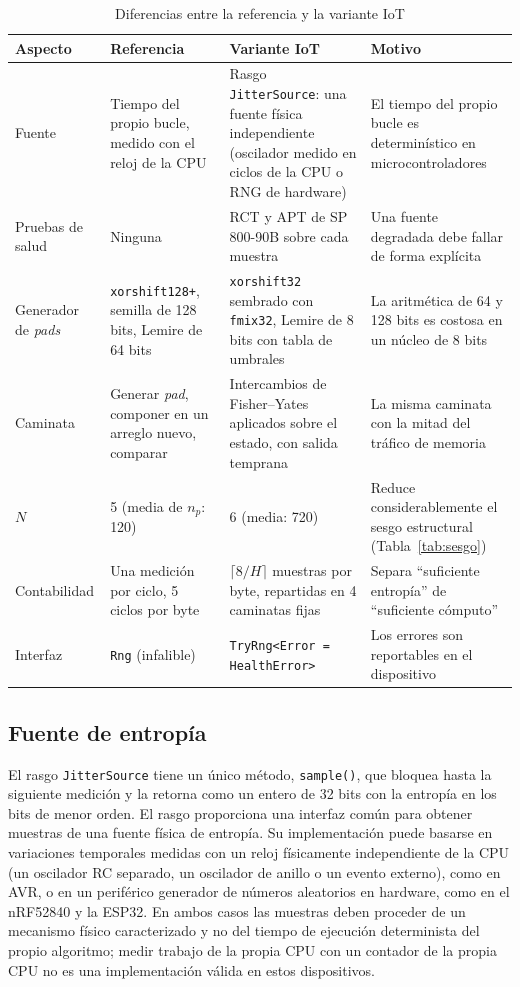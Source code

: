 \begin{table}[H]
\centering
\caption{Diferencias entre la referencia y la variante IoT}
\label{tab:cambios_iot}
\begin{tabularx}{\textwidth}{@{}L{0.17\textwidth}L{0.25\textwidth}L{0.27\textwidth}Y@{}}
\toprule
\textbf{Aspecto} & \textbf{Referencia} & \textbf{Variante IoT} & \textbf{Motivo} \\
\midrule
Fuente & Tiempo del propio bucle, medido con el reloj de la CPU & Rasgo \texttt{JitterSource}: una fuente física independiente (oscilador medido en ciclos de la CPU o RNG de hardware) & El tiempo del propio bucle es determinístico en microcontroladores \\
Pruebas de salud & Ninguna & RCT y APT de SP 800-90B sobre cada muestra & Una fuente degradada debe fallar de forma explícita \\
Generador de \textit{pads} & \texttt{xorshift128+}, semilla de 128 bits, Lemire de 64 bits & \texttt{xorshift32} sembrado con \texttt{fmix32}, Lemire de 8 bits con tabla de umbrales & La aritmética de 64 y 128 bits es costosa en un núcleo de 8 bits \\
Caminata & Generar \textit{pad}, componer en un arreglo nuevo, comparar & Intercambios de Fisher--Yates aplicados sobre el estado, con salida temprana & La misma caminata con la mitad del tráfico de memoria \\
$N$ & 5 (media de $n_p$: 120) & 6 (media: 720) & Reduce considerablemente el sesgo estructural (Tabla~\ref{tab:sesgo}) \\
Contabilidad & Una medición por ciclo, 5 ciclos por byte & $\lceil 8/H \rceil$ muestras por byte, repartidas en 4 caminatas fijas & Separa ``suficiente entropía'' de ``suficiente cómputo'' \\
Interfaz & \texttt{Rng} (infalible) & \texttt{TryRng<Error = HealthError>} & Los errores son reportables en el dispositivo \\
\bottomrule
\end{tabularx}
\end{table}

\subsection{Fuente de entropía}

El rasgo \texttt{JitterSource} tiene un único método, \texttt{sample()}, que bloquea hasta la siguiente medición y la retorna como un entero de 32 bits con la entropía en los bits de menor orden. El rasgo proporciona una interfaz común para obtener muestras de una fuente física de entropía. Su implementación puede basarse en variaciones temporales medidas con un reloj físicamente independiente de la CPU (un oscilador RC separado, un oscilador de anillo o un evento externo), como en AVR, o en un periférico generador de números aleatorios en hardware, como en el nRF52840 y la ESP32. En ambos casos las muestras deben proceder de un mecanismo físico caracterizado y no del tiempo de ejecución determinista del propio algoritmo; medir trabajo de la propia CPU con un contador de la propia CPU no es una implementación válida en estos dispositivos.

